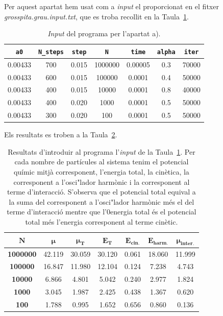 \documentclass[a4paper]{article}
\begin{document}
Per aquest apartat hem usat com a \textit{input} el proporcionat en el fitxer \textit{grosspita.grau.input.txt}, que es troba recollit en la Taula~\ref{tab:input_a}.

\begin{table}[H]
    \centering
    \begin{tabular}{|c|c|c|c|c|c|c|}
        \hline
        \rowcolor[HTML]{EFEFEF}
        \textbf{\texttt{a0}} & \textbf{\texttt{N\_steps}} & \textbf{\texttt{step}} &\textbf{\texttt{N}} & \textbf{\texttt{time}} & \textbf{\texttt{alpha}} & \textbf{\texttt{iter}} \\ \hline\hline
        0.00433 & 700 & 0.015 & 1000000 & 0.00005 & 0.3 & 70000\\ \hline
        0.00433 & 600 & 0.015 & 100000 & 0.0001 & 0.4 & 50000 \\ \hline
        0.00433 & 400 & 0.015 & 10000 & 0.0001 & 0.8 & 40000 \\ \hline
        0.00433 & 400 & 0.020 & 1000 & 0.0001 & 0.5 & 50000 \\ \hline
        0.00433 & 300 & 0.020 & 100 & 0.0001 & 0.5 & 50000 \\ \hline
    \end{tabular}
\caption{\textit{Input} del programa per l'apartat a).}
\label{tab:input_a}
\end{table}

Els resultats es troben a la Taula~\ref{tab:res_a}.

\begin{table}[H]
    \centering
    \begin{tabular}{|c|c|c|c|c|c|c|}
    \hline
        \rowcolor[HTML]{EFEFEF}
        $\mathbf{N}$ & $\boldsymbol{\mu}$ & $\boldsymbol{\mu_{\textbf{T}}}$ & $\boldsymbol{E_{\textbf{T}}}$ & $\boldsymbol{E_{\textbf{cin.}}}$ & $\boldsymbol{E_{\textbf{harm.}}}$ & $\boldsymbol{\mu_{\textbf{inter.}}}$ \\ \hline\hline
        \textbf{1000000} & 42.119 & 30.059 & 30.120 & 0.061 & 18.060 & 11.999 \\ \hline
        \textbf{100000} & 16.847 & 11.980 & 12.104 & 0.124 & 7.238 & 4.743 \\ \hline
        \textbf{10000} & 6.866 & 4.801 & 5.042 & 0.240 & 2.977 & 1.824 \\ \hline
        \textbf{1000} & 3.045 & 1.987 & 2.425 & 0.438 & 1.367 & 0.620 \\ \hline
        \textbf{100} & 1.788 & 0.995 & 1.652 & 0.656 & 0.860 & 0.136 \\ \hline
    \end{tabular}
\caption{Resultats d'introduir al programa l'\textit{input} de la Taula~\ref{tab:input_a}. Per cada nombre de partícules al sistema tenim el potencial químic mitjà corresponent, l'energia total, la cinètica, la corresponent a l'osci"lador harmònic i la corresponent al terme d'interacció. S'observa que el potencial total equival a la suma del corresponent a l'osci"lador harmònic més el del terme d'interacció mentre que l'0energia total és el potencial total més l'energia corresponent al terme cinètic.}
\label{tab:res_a}
\end{table}
\end{document}
